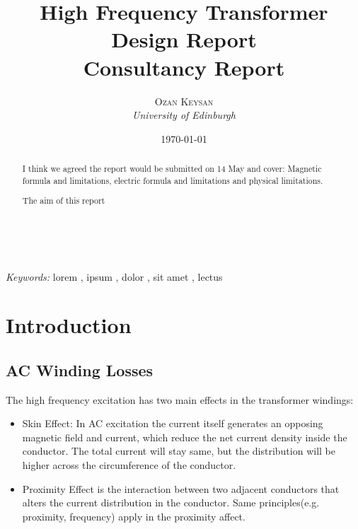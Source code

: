 \documentclass[a4paper, 11pt]{article} %
\title{\textbf{High Frequency Transformer Design Report}\\ %
Consultancy Report} %
\author{\textsc{Ozan Keysan} %
\\{\textit{University of Edinburgh}}} %
\date{\today} %
\makeatletter
\renewcommand{\maketitle}{ %
\begin{flushright} %
{\LARGE\@title} %

\vspace{50pt} %

{\large\@author} %
\\\@date %

\vspace{40pt} %
\end{flushright}
}
\makeatother
\begin{document}
\maketitle %



\begin{abstract}
I think we agreed the report would be submitted on 14 May and cover: Magnetic formula and limitations, electric formula and limitations and physical limitations.

The aim of this report


\end{abstract}

\hspace*{3,6mm}\textit{Keywords:} lorem , ipsum , dolor , sit amet , lectus %

\vspace{30pt} %


\section*{Introduction}



\subsection{AC Winding Losses}

The high frequency excitation has two main effects in the transformer windings:
\begin{itemize}
  \item Skin Effect: In AC excitation the current itself generates an opposing magnetic field and current, which reduce the net current density inside the conductor. The total current will stay same, but the distribution will be higher across the circumference of the conductor.
  \item Proximity Effect is the interaction between two adjacent conductors that alters the current distribution in the conductor. Same principles(e.g. proximity, frequency) apply in the proximity affect.
\end{itemize}
\end{document}
